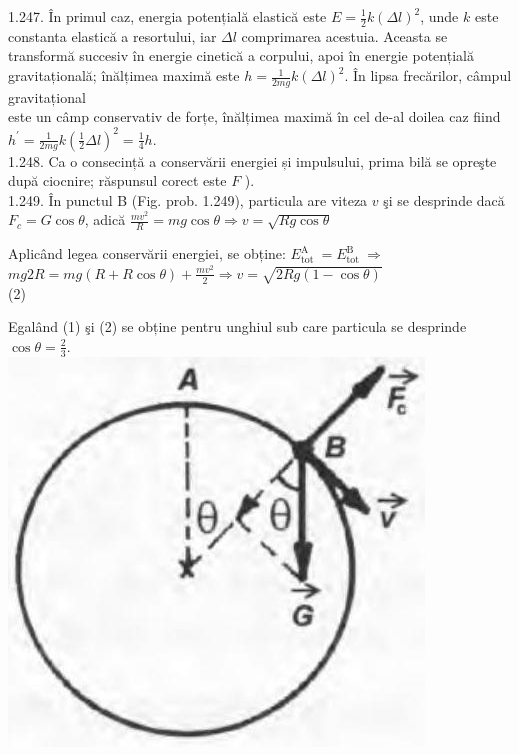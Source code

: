 \documentclass[10pt]{article}
\begin{document}
1.247. În primul caz, energia potențială elastică este $E=\frac{1}{2} k(\Delta l)^{2}$, unde $k$ este constanta elastică a resortului, iar $\Delta l$ comprimarea acestuia. Aceasta se transformă succesiv în energie cinetică a corpului, apoi în energie potențială gravitațională; înălțimea maximă este $h=\frac{1}{2 m g} k(\Delta l)^{2}$. În lipsa frecărilor, câmpul gravitațional\\
este un câmp conservativ de forțe, înălțimea maximă în cel de-al doilea caz fiind $h^{\prime}=\frac{1}{2 m g} k\left(\frac{1}{2} \Delta l\right)^{2}=\frac{1}{4} h$.\\
1.248. Ca o consecință a conservării energiei și impulsului, prima bilă se opreşte după ciocnire; răspunsul corect este $F$ ).\\
1.249. În punctul B (Fig. prob. 1.249), particula are viteza $v$ şi se desprinde dacă $F_{c}=G \cos \theta$, adică $\frac{m v^{2}}{R}=m g \cos \theta \Rightarrow v=\sqrt{R g \cos \theta}$

Aplicând legea conservării energiei, se obține: $E_{\text {tot }}^{\mathrm{A}}=E_{\text {tot }}^{\mathrm{B}} \Rightarrow$\\
$m g 2 R=m g(R+R \cos \theta)+\frac{m v^{2}}{2} \Rightarrow v=\sqrt{2 R g(1-\cos \theta)}$\\
(2)

Egalând (1) şi (2) se obține pentru unghiul sub care particula se desprinde $\cos \theta=\frac{2}{3}$.\\
\includegraphics[max width=\textwidth, center]{2025_07_01_5b3ff9fa0d508c8e9f17g-250(1)}
\end{document}
